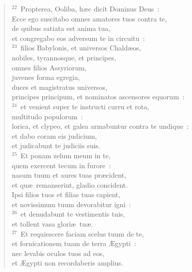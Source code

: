 \begin{flushleft}\begin{verse}${}^{22}$~Propterea, Ooliba, h\ae c dicit Dominus Deus~:\\ Ecce ego suscitabo omnes amatores tuos contra te,\\ de quibus satiata est anima tua,\\ et congregabo eos adversum te in circuitu~:\\
${}^{23}$~filios Babylonis, et universos Chald\ae os,\\ nobiles, tyrannosque, et principes,\\ omnes filios Assyriorum,\\ juvenes forma egregia,\\ duces et magistratus universos,\\ principes principum, et nominatos ascensores equorum~:\\
${}^{24}$~et venient super te instructi curru et rota,\\ multitudo populorum~:\\ lorica, et clypeo, et galea armabuntur contra te undique~:\\ et dabo coram eis judicium,\\ et judicabunt te judiciis suis.\\
${}^{25}$~Et ponam zelum meum in te,\\ quem exercent tecum in furore~:\\ nasum tuum et aures tuas pr\ae cident,\\ et qu\ae\ remanserint, gladio concident.\\ Ipsi filios tuos et filias tuas capient,\\ et novissimum tuum devorabitur igni~:\\
${}^{26}$~et denudabunt te vestimentis tuis,\\ et tollent vasa glori\ae\ tu\ae .\\
${}^{27}$~Et requiescere faciam scelus tuum de te,\\ et fornicationem tuam de terra \AE gypti~:\\ nec levabis oculos tuos ad eos,\\ et \AE gypti non recordaberis amplius.\end{verse}\end{flushleft}


